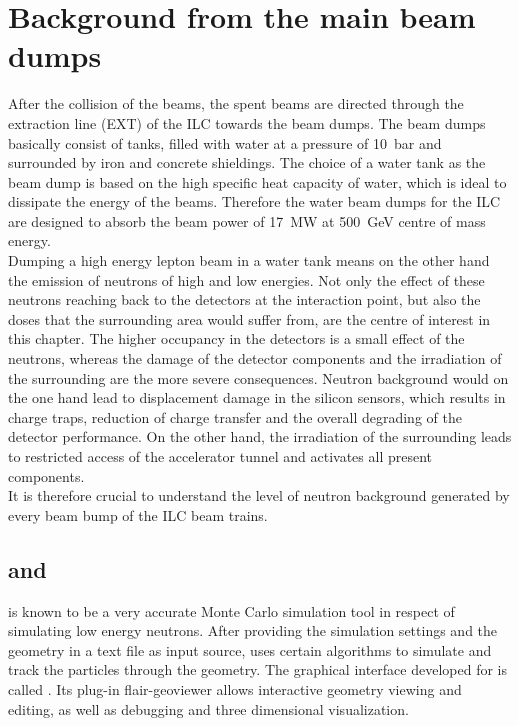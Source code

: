 \chapter{Background from the main beam dumps}
\label{BeamDumps}
After the collision of the \positron\electron beams, the spent beams are directed through the extraction line (EXT) of the ILC towards the beam dumps. The beam dumps basically consist of tanks, filled with water at a pressure of \SI{10}{\bar} and surrounded by iron and concrete shieldings. The choice of a water tank as the beam dump is based on the high specific heat capacity of water, which is ideal to dissipate the energy of the beams. Therefore the water beam dumps for the ILC are designed to absorb the beam power of \SI{17}{\mega\watt} at \SI{500}{\GeV} centre of mass energy.\\
Dumping a high energy lepton beam in a water tank means on the other hand the emission of neutrons of high and low energies. Not only the effect of these neutrons reaching back to the detectors at the interaction point, but also the doses that the surrounding area would suffer from, are the centre of interest in this chapter. The higher occupancy in the detectors is a small effect of the neutrons, whereas the damage of the detector components and the irradiation of the surrounding are the more severe consequences. Neutron background would on the one hand lead to displacement damage in the silicon sensors, which results in charge traps, reduction of charge transfer and the overall degrading of the detector performance. On the other hand, the irradiation of the surrounding leads to restricted access of the accelerator tunnel and activates all present components.\\It is therefore crucial to understand the level of neutron background generated by every beam bump of the ILC beam trains.

\section{\fluka and \flair}
\label{BeamDumps:fluka}
\fluka is known to be a very accurate Monte Carlo simulation tool in respect of simulating low energy neutrons. After providing the simulation settings and the geometry in a text file as input source, \fluka uses certain algorithms to simulate and track the particles through the geometry.
The graphical interface developed for \fluka is called \flair. Its plug-in flair-geoviewer allows interactive geometry viewing and editing, as well as debugging and three dimensional visualization.

